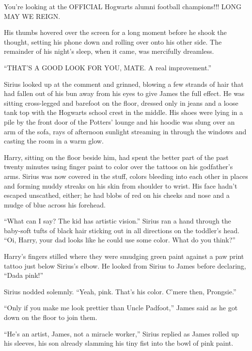 You’re looking at the OFFICIAL Hogwarts alumni football champions!!! LONG MAY WE REIGN.

His thumbs hovered over the screen for a long moment before he shook the thought, setting his phone down and rolling over onto his other side. The remainder of his night’s sleep, when it came, was mercifully dreamless.

\newpage


“THAT’S A GOOD LOOK FOR YOU, MATE. A real improvement.”

Sirius looked up at the comment and grinned, blowing a few strands of hair that had fallen out of his bun away from his eyes to give James the full effect. He was sitting cross-legged and barefoot on the floor, dressed only in jeans and a loose tank top with the Hogwarts school crest in the middle. His shoes were lying in a pile by the front door of the Potters’ lounge and his hoodie was slung over an arm of the sofa, rays of afternoon sunlight streaming in through the windows and casting the room in a warm glow.

Harry, sitting on the floor beside him, had spent the better part of the past twenty minutes using finger paint to color over the tattoos on his godfather’s arms. Sirius was now covered in the stuff, colors bleeding into each other in places and forming muddy streaks on his skin from shoulder to wrist. His face hadn’t escaped unscathed, either; he had blobs of red on his cheeks and nose and a mudge of blue across his forehead.

“What can I say? The kid has artistic vision.” Sirius ran a hand through the baby-soft tufts of black hair sticking out in all directions on the toddler’s head. “Oi, Harry, your dad looks like he could use some color. What do you think?”

Harry’s fingers stilled where they were smudging green paint against a paw print tattoo just below Sirius’s elbow. He looked from Sirius to James before declaring, “Dada pink!”

Sirius nodded solemnly. “Yeah, pink. That’s his color. C’mere then, Prongsie.”

“Only if you make me look prettier than Uncle Padfoot,” James said as he got down on the floor to join them.

“He’s an artist, James, not a miracle worker,” Sirius replied as James rolled up his sleeves, his son already slamming his tiny fist into the bowl of pink paint.

